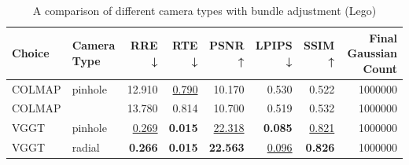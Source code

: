 \begin{table}[H]
\caption{A comparison of different camera types with bundle adjustment (Lego)}
\label{tab:10_camera_type_lego}
\begin{tabular}{llrrrrrr}
\toprule
Choice & Camera Type & RRE ↓ & RTE ↓ & PSNR ↑ & LPIPS ↓ & SSIM ↑ & Final Gaussian Count \\
\midrule
COLMAP & pinhole & 12.910 & \underline{0.790} & 10.170 & 0.530 & 0.522 & 1000000 \\
COLMAP &  & 13.780 & 0.814 & 10.700 & 0.519 & 0.532 & 1000000 \\
VGGT & pinhole & \underline{0.269} & \textbf{0.015} & \underline{22.318} & \textbf{0.085} & \underline{0.821} & 1000000 \\
VGGT & radial & \textbf{0.266} & \textbf{0.015} & \textbf{22.563} & \underline{0.096} & \textbf{0.826} & 1000000 \\
\bottomrule
\end{tabular}
\end{table}
